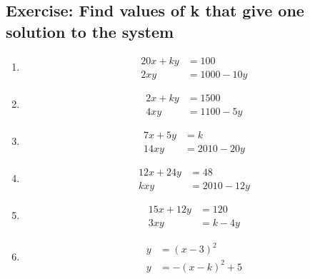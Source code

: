 \documentclass[a4paper,11pt]{article}
\begin{document}
\subsection{Exercise: Find values of k that give one solution to the system}\label{ex9}
\begin{multicols}{3}
\begin{enumerate}
\item \begin{align*}
20x+ky&=100\\
2xy&=1000-10y
\end{align*}
\item \begin{align*}
2x+ky&=1500\\
4xy&=1100-5y
\end{align*}
\item \begin{align*}
7x+5y&=k\\
14xy&=2010-20y
\end{align*}
\item \begin{align*}
12x+24y&=48\\
kxy&=2010-12y
\end{align*}
\item \begin{align*}
15x+12y&=120\\
3xy&=k-4y
\end{align*}
\item \begin{align*}
y&=(x-3)^{2}\\
y&=-(x-k)^{2}+5
\end{align*}
\end{enumerate}
\end{multicols} 
\newpage
\end{document}
